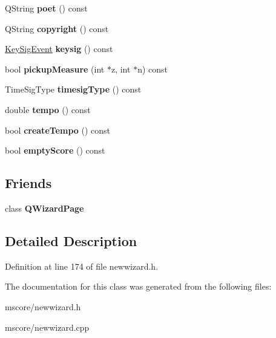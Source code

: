 \begin{DoxyCompactItemize}
Q\+String {\bfseries poet} () const
\item 
\mbox{\label{class_ms_1_1_new_wizard_a2a078f123c3b1b8c52f89ff8dcecf745}} 
Q\+String {\bfseries copyright} () const
\item 
\mbox{\label{class_ms_1_1_new_wizard_a954b4e3c8000ea44082c1a34a84746a5}} 
\hyperlink{class_ms_1_1_key_sig_event}{Key\+Sig\+Event} {\bfseries keysig} () const
\item 
\mbox{\label{class_ms_1_1_new_wizard_a589dc883683f68f7014d616e805461bb}} 
bool {\bfseries pickup\+Measure} (int $\ast$z, int $\ast$n) const
\item 
\mbox{\label{class_ms_1_1_new_wizard_a22ffe4f6ca6f06cdb2243477ed5ad95e}} 
Time\+Sig\+Type {\bfseries timesig\+Type} () const
\item 
\mbox{\label{class_ms_1_1_new_wizard_a70ad2491087fd3c45d1ce5159211bfdf}} 
double {\bfseries tempo} () const
\item 
\mbox{\label{class_ms_1_1_new_wizard_aa985db3322332c91df7fda938d49403a}} 
bool {\bfseries create\+Tempo} () const
\item 
\mbox{\label{class_ms_1_1_new_wizard_aff45d5b08b8949197757ba96775ca83d}} 
bool {\bfseries empty\+Score} () const
\end{DoxyCompactItemize}
\subsection*{Friends}
\begin{DoxyCompactItemize}
\item 
\mbox{\label{class_ms_1_1_new_wizard_a4a4654bb692ca9d9e7257a4383ac7e35}} 
class {\bfseries Q\+Wizard\+Page}
\end{DoxyCompactItemize}


\subsection{Detailed Description}


Definition at line 174 of file newwizard.\+h.



The documentation for this class was generated from the following files\+:\begin{DoxyCompactItemize}
\item 
mscore/newwizard.\+h\item 
mscore/newwizard.\+cpp\end{DoxyCompactItemize}
